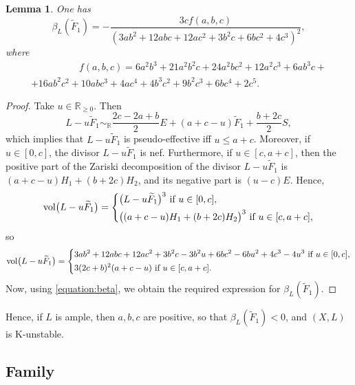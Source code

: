 \documentclass[12pt]{amsart}
\newtheorem{lemma}[theorem]{Lemma}
\theoremstyle{definition}
\theoremstyle{remark}
\begin{document}
\begin{lemma}
\label{lemma:3-22}
One has
$$
\beta_{L}(\widetilde{F}_1)=-\frac{3cf(a,b,c)}{(3ab^2+12abc+12ac^2+3b^2c+6bc^2+ 4c^3)^2},
$$
where
\begin{multline*}
\quad \quad \quad \quad \quad f(a,b,c)=6a^2b^3+21a^2b^2c+24a^2bc^2+12a^2c^3+6ab^3c+\\
+16ab^2c^2+10abc^3+4ac^4+4b^3c^2+9b^2c^3+6bc^4+2c^5. \quad \quad \quad \quad  \quad
\end{multline*}
\end{lemma}

\begin{proof}
Take $u\in\mathbb{R}_{\geqslant 0}$. Then
$$
L-u\widetilde{F}_1\sim_{\mathbb{R}}\frac{2c-2a+b}{2}E+(a+c-u)\widetilde{F}_1+\frac{b+2c}{2}S,
$$
which implies that $L-u\widetilde{F}_1$ is pseudo-effective iff $u\leqslant a+c$. Moreover, if $u\in[0,c]$, the divisor $L-u\widetilde{F}_1$ is nef.
Furthermore, if $u\in[c,a+c]$, then the positive part of the Zariski decomposition of the divisor $L-u\widetilde{F}_1$ is $(a+c-u)H_1+(b+2c)H_2$, and its negative part is $(u-c)E$. Hence,
$$
\mathrm{vol}\big(L-u\widetilde{F}_1\big)=\left\{\aligned
&\big(L-u\widetilde{F}_1\big)^3\ \text{if $u\in[0,c]$},\\
&\big((a+c-u)H_1+(b+2c)H_2\big)^3\ \text{if $u\in[c,a+c]$},
\endaligned
\right.
$$
so
$$
\mathrm{vol}\big(L-u\widetilde{F}_1\big)=\left\{\aligned
&3ab^2+12abc+12ac^2+3b^2c-3b^2u+6bc^2-6bu^2+4c^3-4u^3\ \text{if $u\in[0,c]$},\\
&3(2c+b)^2(a+c-u)\ \text{if $u\in[c,a+c]$}.
\endaligned
\right.
$$
Now, using \eqref{equation:beta}, we obtain the required expression for $\beta_{L}(\widetilde{F}_1)$.
\end{proof}

Hence, if $L$ is ample, then $a,b,c$ are positive, so that $\beta_{L}(\widetilde{F}_1)<0$, and $(X,L)$ is K-unstable.

\subsection{Family }
\label{subsection:3-23}
\end{document}
